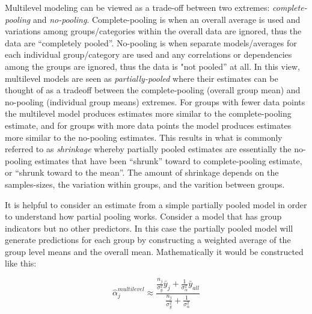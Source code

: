 Multilevel modeling can be viewed as a trade-off between two extremes: \textit{complete-pooling} and \textit{no-pooling}. Complete-pooling is when an overall average is used and variations among groups/categories within the overall data are ignored, thus the data are “completely pooled”. No-pooling is when separate models/averages for each individual group/category are used and any correlations or dependencies among the groups are ignored, thus the data is "not pooled” at all. In this view, multilevel models are seen as \textit{partially-pooled} where their estimates can be thought of as a tradeoff between the complete-pooling (overall group mean) and no-pooling (individual group means) extremes. For groups with fewer data points the multilevel model produces estimates more similar to the complete-pooling estimate, and for groups with more data points the model produces estimates more similar to the no-pooling estimates. This results in what is commonly referred to as \textit{shrinkage} whereby partially pooled estimates are essentially the no-pooling estimates that have been “shrunk” toward to complete-pooling estimate, or “shrunk toward to the mean”. The amount of shrinkage depends on the samples-sizes, the variation within groups, and the varition between groups.

It is helpful to consider an estimate from a simple partially pooled model in order to understand how partial pooling works. Consider a model that has group indicators but no other predictors. In this case the partially pooled model will generate predictions for each group by constructing a weighted average of the group level means and the overall mean. Mathematically it would be constructed like this:

\begin{equation} \label{eq:mlm_ex}
\hat{\alpha}_j^{multilevel} \approx \frac{ \frac{n_j}{\sigma_y^2} \bar{y}_j + \frac{1}{\sigma_{\alpha}^2} \bar{y}_{all} }{ \frac{n_j}{\sigma_y^2} + \frac{1}{\sigma_{\alpha}^2} }
\end{equation}

